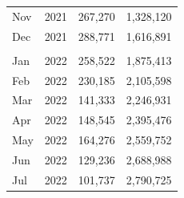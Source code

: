\documentclass[landscape]{slides}
\begin{document}
\begin{slide}
\begin{center}
\begin{tabular}{llrr}
Nov       & 2021     &267,270   &1,328,120 \\ 
Dec       & 2021     &288,771   &1,616,891 \\ 
& & & \\
Jan       & 2022     &258,522   &1,875,413 \\ 
Feb       & 2022     &230,185   &2,105,598 \\ 
Mar       & 2022     &141,333   &2,246,931 \\ 
Apr       & 2022     &148,545   &2,395,476 \\
May       & 2022     &164,276   &2,559,752 \\
Jun       & 2022     &129,236   &2,688,988 \\
Jul       & 2022     &101,737   &2,790,725 \\
\end{tabular}
\end{center}

\vfill
\end{slide}
\end{document}
